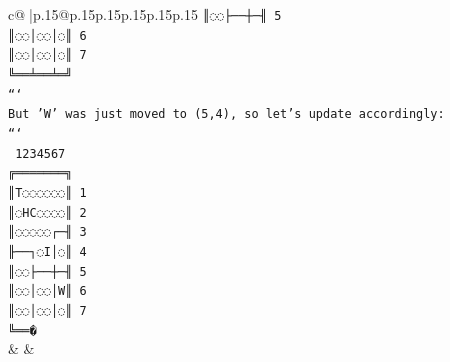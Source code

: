 \documentclass{article}
\begin{document}
{\begin{supertabular}{c@{$\;$}|p{.15\linewidth}@{}p{.15\linewidth}p{.15\linewidth}p{.15\linewidth}p{.15\linewidth}p{.15\linewidth}}
{{{\texttt{║◌◌├──┼─╢ 5} \\
\texttt{║◌◌│◌◌│◌║ 6} \\
\texttt{║◌◌│◌◌│◌║ 7} \\
\texttt{╚══╧══╧═╝} \\
\texttt{```} \\
\texttt{But 'W' was just moved to (5,4), so let's update accordingly:} \\
\texttt{```} \\
\texttt{ 1234567} \\
\texttt{╔═══════╗} \\
\texttt{║T◌◌◌◌◌◌║ 1} \\
\texttt{║◌HC◌◌◌◌║ 2} \\
\texttt{║◌◌◌◌◌┌─╢ 3} \\
\texttt{╟──┐◌I│◌║ 4} \\
\texttt{║◌◌├──┼─╢ 5} \\
\texttt{║◌◌│◌◌│W║ 6} \\
\texttt{║◌◌│◌◌│◌║ 7} \\
\texttt{╚══�} \\
            }
        }
    }
    & & \\ \\


\end{supertabular}}
\end{document}
